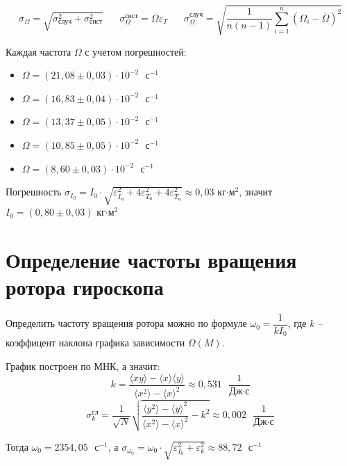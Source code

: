 \documentclass[a4paper,12pt]{article}
\begin{document}
	\begin{equation}
		\sigma_\Omega = \sqrt{ \sigma_\text{случ}^2 + \sigma_\text{сист}^2} \;\;\;\;\;\; \sigma_\Omega^\text{сист} = \Omega \varepsilon_T \;\;\;\;\;\; \sigma_\Omega^\text{случ}=  \sqrt{\frac{1}{n(n-1)} \sum_{i=1}^{n}(\Omega_i - \overline{\Omega})^2}
	\end{equation}
	
	Каждая частота $\Omega$ с учетом погрешностей:
	\begin{itemize}
		\item $\Omega = (21,08 \pm 0,03)\cdot10^{-2}\text{ }\text{с}^{-1}$ 
		\item $\Omega = (16,83 \pm 0,04)\cdot10^{-2}\text{ }\text{с}^{-1}$
		\item $\Omega = (13,37 \pm 0,05)\cdot10^{-2}\text{ }\text{с}^{-1}$
		\item $\Omega = (10,85 \pm 0,05)\cdot10^{-2}\text{ }\text{с}^{-1}$
		\item $\Omega = (8,60 \pm 0,03)\cdot10^{-2}\text{ }\text{с}^{-1}$
	\end{itemize}

	Погрешность $\sigma_{I_0} = I_0\cdot\sqrt{\varepsilon_{I_\text{ц}}^2+ 4\varepsilon_{T_0}^2+ 4\varepsilon_{T_\text{ц}}^2 } \approx 0,03$ кг$\cdot \text{м}^2$, значит $I_0 = (0,80\pm 0,03)$ кг$\cdot \text{м}^2$
	
	\section{Определение частоты вращения ротора гироскопа}
	
	Определить частоту вращения ротора можно по формуле $\omega_0 = \dfrac{1}{kI_0}$, где $k$ -- коэффицент наклона графика зависимости $\Omega(M)$.
	
	График построен по МНК, а значит:
	\begin{equation}
	k=\frac{\langle xy\rangle-\langle x\rangle \langle y\rangle}{\langle x^2\rangle - \langle x\rangle^2}\approx 0,531\text{ }\frac{1}{\text{Дж}\cdot\text{с}}
	\end{equation}
	\begin{equation}
		\sigma_k^\text{сл}=\frac{1}{\sqrt{N}}\sqrt{\frac{\langle y^2 \rangle - \langle y \rangle^2}{\langle x^2 \rangle - \langle x \rangle^2} - k^2  } \approx 0,002\text{ }\frac{1}{\text{Дж}\cdot\text{с}}
	\end{equation}

	Тогда $\omega_0 = 2354,05\text{ }\text{с}^{-1}$, а $\sigma_{\omega_0} = \omega_0\cdot\sqrt{\varepsilon_{I_0}^2+ \varepsilon_k^2} \approx 88,72\text{ }\text{с}^{-1}$
	
\end{document}
